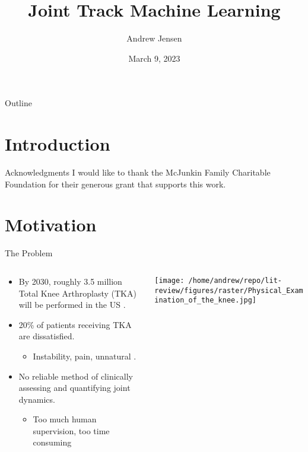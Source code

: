 \documentclass[presentation, aspectratio=1610]{beamer}
\author{Andrew Jensen}
\date{March 9, 2023}
\title{Joint Track Machine Learning}
\begin{document}
\maketitle
\begin{frame}{Outline}
\tableofcontents
\end{frame}


\section{Introduction}
\label{sec:org90aff05}
\begin{frame}[label={sec:org8ac3493}]{Acknowledgments}
I would like to thank the McJunkin Family Charitable Foundation for their generous grant that supports this work.
\end{frame}
\section{Motivation}
\label{sec:org174cea0}
\begin{frame}[label={sec:orgf1a3c16}]{The Problem}
\begin{columns}
\begin{column}{0.5\columnwidth}
\begin{itemize}
\item By 2030, roughly 3.5 million Total Knee Arthroplasty (TKA) will be performed in the US \autocite{kurtzProjectionsPrimaryRevision2007}.
\item 20\% of patients receiving TKA are dissatisfied.
\begin{itemize}
\item Instability, pain, unnatural \autocites{bakerRolePainFunction2007}[][]{bournePatientSatisfactionTotal2010}[][]{scottPredictingDissatisfactionFollowing2010}.
\end{itemize}
\item No reliable method of clinically assessing and quantifying joint dynamics.
\begin{itemize}
\item Too much human supervision, too time consuming
\end{itemize}
\end{itemize}
\end{column}
\begin{column}{0.5\columnwidth}
\begin{center}
\texttt{[image: /home/andrew/repo/lit-review/figures/raster/Physical\_Examination\_of\_the\_knee.jpg]}
\end{center}
\end{column}
\end{columns}
\end{frame}
\end{document}
